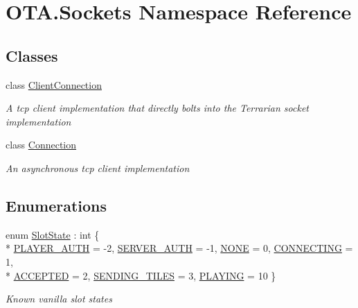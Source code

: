\hypertarget{namespaceOTA_1_1Sockets}{}\section{O\+T\+A.\+Sockets Namespace Reference}
\label{namespaceOTA_1_1Sockets}
\subsection*{Classes}
\begin{DoxyCompactItemize}
\item 
class \hyperlink{classOTA_1_1Sockets_1_1ClientConnection}{Client\+Connection}
\begin{DoxyCompactList}\small\item\em A tcp client implementation that directly bolts into the Terrarian socket implementation \end{DoxyCompactList}\item 
class \hyperlink{classOTA_1_1Sockets_1_1Connection}{Connection}
\begin{DoxyCompactList}\small\item\em An asynchronous tcp client implementation \end{DoxyCompactList}\end{DoxyCompactItemize}
\subsection*{Enumerations}
\begin{DoxyCompactItemize}
\item 
enum \hyperlink{namespaceOTA_1_1Sockets_a74279593a3ea6456730e42aa2299a916}{Slot\+State} \+: int \{ \\*
\hyperlink{namespaceOTA_1_1Sockets_a74279593a3ea6456730e42aa2299a916a93dd5a77b688ef34fcb26469278c13b1}{P\+L\+A\+Y\+E\+R\+\_\+\+A\+U\+T\+H} = -\/2, 
\hyperlink{namespaceOTA_1_1Sockets_a74279593a3ea6456730e42aa2299a916a0cefceee4b791ca19d9e0dabcb8441fe}{S\+E\+R\+V\+E\+R\+\_\+\+A\+U\+T\+H} = -\/1, 
\hyperlink{namespaceOTA_1_1Sockets_a74279593a3ea6456730e42aa2299a916ab50339a10e1de285ac99d4c3990b8693}{N\+O\+N\+E} = 0, 
\hyperlink{namespaceOTA_1_1Sockets_a74279593a3ea6456730e42aa2299a916a9a14f95e151eec641316e7c784ce832d}{C\+O\+N\+N\+E\+C\+T\+I\+N\+G} = 1, 
\\*
\hyperlink{namespaceOTA_1_1Sockets_a74279593a3ea6456730e42aa2299a916aa806f1d2c42338ef5fa6497b66153e79}{A\+C\+C\+E\+P\+T\+E\+D} = 2, 
\hyperlink{namespaceOTA_1_1Sockets_a74279593a3ea6456730e42aa2299a916a547018cad1e3b450cff8b5348b78c4da}{S\+E\+N\+D\+I\+N\+G\+\_\+\+T\+I\+L\+E\+S} = 3, 
\hyperlink{namespaceOTA_1_1Sockets_a74279593a3ea6456730e42aa2299a916a50366a49630a416ab3ccaa004196027e}{P\+L\+A\+Y\+I\+N\+G} = 10
 \}\begin{DoxyCompactList}\small\item\em Known vanilla slot states \end{DoxyCompactList}
\end{DoxyCompactItemize}



